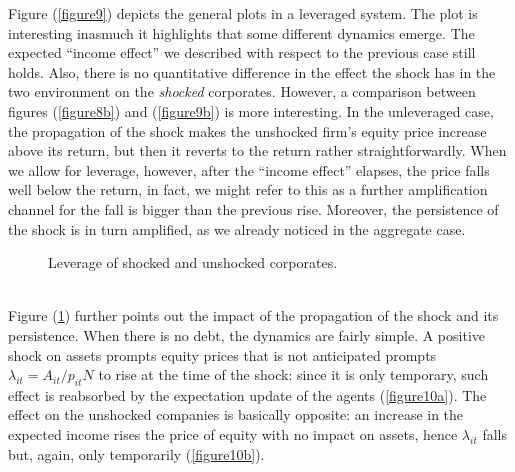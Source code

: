 \documentclass[11pt]{article}
\begin{document}
Figure (\ref{figure9}) depicts the general plots in a leveraged system. The plot is interesting inasmuch it highlights that some different dynamics emerge. The expected ``income effect'' we described with respect to the previous case still holds. Also, there is no quantitative difference in the effect the shock has in the two environment on the \emph{shocked} corporates. However, a comparison between figures (\ref{figure8b}) and (\ref{figure9b}) is more interesting. In the unleveraged case, the propagation of the shock makes the unshocked firm's equity price increase above its return, but then it reverts to the return rather straightforwardly. When we allow for leverage, however, after the ``income effect'' elapses, the price falls well below the return, in fact, we might refer to this as a further amplification channel for the fall is bigger than the previous rise. Moreover, the persistence of the shock is in turn amplified, as we already noticed in the aggregate case.
\begin{figure}[h!]
\centering
{}\quad
{}
 \caption{Leverage of shocked and unshocked corporates.} \label{figure10}
\end{figure}\\
Figure (\ref{figure10}) further points out the impact of the propagation of the shock  and its persistence. When there is no debt, the dynamics are fairly simple. A positive shock on assets prompts equity prices that is not anticipated prompts $\lambda_{it} = A_{it}/p_{it}N$ to rise at the time of the shock: since it is only temporary, such effect is reabsorbed by the expectation update of the agents (\ref{figure10a}). The effect on the unshocked companies is basically opposite: an increase in the expected income rises the price of equity with no impact on assets, hence $\lambda_{it}$ falls but, again, only temporarily (\ref{figure10b}).\\
\end{document}
